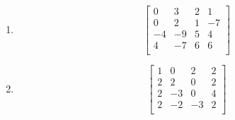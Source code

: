 \begin{puzzle}
\begin{enumerate}
        \item
              \[
                  \begin{bmatrix}
                      0  & 3  & 2 & 1  \\
                      0  & 2  & 1 & -7 \\
                      -4 & -9 & 5 & 4  \\
                      4  & -7 & 6 & 6  \\
                  \end{bmatrix}
              \]
        \item \[
                  \begin{bmatrix}
                      1 & 0  & 2  & 2 \\
                      2 & 2  & 0  & 2 \\
                      2 & -3 & 0  & 4 \\
                      2 & -2 & -3 & 2 \\
                  \end{bmatrix}
              \]
    \end{enumerate}
\end{puzzle}
